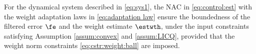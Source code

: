 \documentclass[letterpaper, journal]{IEEEtran}
\newcommand{\ctxt}[2]{\color{#1}#2\color{black}}
\begin{document}
\begin{theorem}
    For the dynamical system described in \eqref{eq:sys1}, the NAC in \eqref{eq:control:est} with the weight adaptation laws in \eqref{eq:adaptation law} ensure the boundedness of the filtered error $\fe$ and the weight estimate $\estwth$, under the input constraints satisfying Assumption \ref{assum:convex} and \ref{assum:LICQ}, provided that the weight norm constraints \eqref{eq:cstr:weight:ball} are imposed.
\end{theorem}
\end{document}
